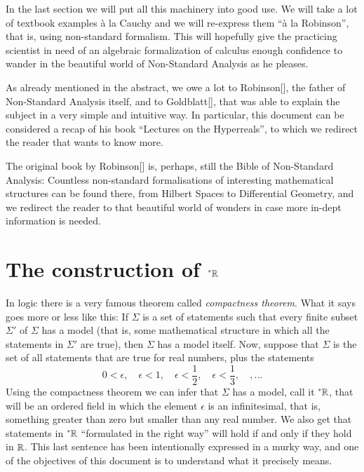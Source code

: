 \documentclass[adraft, copyright,creativecommons,sharealike,noncommercial]{Preambles/eptcs}
\newcommand{\nstar}{{^*}}
\begin{document}
In the last section we will put all this machinery into good use. We will take a lot of textbook examples \`a la Cauchy and we will re-express them ``\`a la Robinson'', that is, using non-standard formalism. This will hopefully give the practicing scientist in need of an algebraic formalization of calculus enough confidence to wander in the beautiful world of Non-Standard Analysis as he pleases.

As already mentioned in the abstract, we owe a lot to Robinson[], the father of Non-Standard Analysis itself, and to Goldblatt[], that was able to explain the subject in a very simple and intuitive way. In particular, this document can be considered a recap of his book ``Lectures on the Hyperreals'', to which we redirect the reader that wants to know more.

The original book by Robinson[] is, perhaps, still the Bible of Non-Standard Analysis: Countless non-standard formalisations of interesting mathematical structures can be found there, from Hilbert Spaces to Differential Geometry, and we redirect the reader to that beautiful world of wonders in case more in-dept information is needed.

\section{The construction of $\nstar \reals$}
In logic there is a very famous theorem called \emph{compactness theorem}. What it says goes more or less like this: If $\Sigma$ is a set of statements such that every finite subset $\Sigma'$ of $\Sigma$ has a model (that is, some mathematical structure in which all the statements in $\Sigma'$ are true), then $\Sigma$ has a model itself. Now, suppose that $\Sigma$ is the set of all statements that are true for real numbers, plus the statements
\begin{equation*}
	0 < \epsilon,\quad \epsilon < 1,\quad \epsilon < \frac{1}{2}, \quad \epsilon < \frac{1}{3}, \quad, \dots
\end{equation*}
Using the compactness theorem we can infer that $\Sigma$ has a model, call it $\nstar \reals$, that will be an ordered field in which the element $\epsilon$ is an infinitesimal, that is, something greater than zero but smaller than any real number. We also get that statements in $\nstar \reals$ ``formulated in the right way'' will hold if and only if they hold in $\mathbb{R}$. This last sentence has been intentionally expressed in a murky way, and one of the objectives of this document is to understand what it precisely means.
\end{document}
